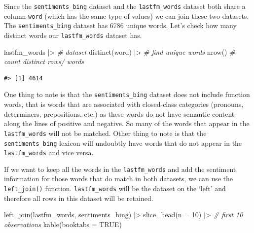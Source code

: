\documentclass[
  letterpaper,
]{latex/krantz}
\newenvironment{Shaded}{\begin{snugshade}}{\end{snugshade}}
\newcommand{\AttributeTok}[1]{\textcolor[rgb]{0.00,0.00,0.00}{#1}}
\newcommand{\CommentTok}[1]{\textcolor[rgb]{0.00,0.00,0.00}{\textit{#1}}}
\newcommand{\ConstantTok}[1]{\textcolor[rgb]{0.00,0.00,0.00}{#1}}
\newcommand{\DecValTok}[1]{\textcolor[rgb]{0.00,0.00,0.00}{#1}}
\newcommand{\FunctionTok}[1]{\textcolor[rgb]{0.00,0.00,0.00}{#1}}
\newcommand{\NormalTok}[1]{\textcolor[rgb]{0.00,0.00,0.00}{#1}}
\newcommand{\SpecialCharTok}[1]{\textcolor[rgb]{0.00,0.00,0.00}{#1}}
\begin{document}
Since the \texttt{sentiments\_bing} dataset and the
\texttt{lastfm\_words} dataset both share a column \texttt{word} (which
has the same type of values) we can join these two datasets. The
\texttt{sentiments\_bing} dataset has 6786 unique words. Let's check how
many distinct words our \texttt{lastfm\_words} dataset has.

\begin{Shaded}
\begin{Highlighting}[]
\NormalTok{lastfm\_words }\SpecialCharTok{|\textgreater{}} \CommentTok{\# dataset}
  \FunctionTok{distinct}\NormalTok{(word) }\SpecialCharTok{|\textgreater{}} \CommentTok{\# find unique words}
  \FunctionTok{nrow}\NormalTok{() }\CommentTok{\# count distinct rows/ words}
\end{Highlighting}
\end{Shaded}

\begin{verbatim}
#> [1] 4614
\end{verbatim}

One thing to note is that the \texttt{sentiments\_bing} dataset does not
include function words, that is words that are associated with
closed-class categories (pronouns, determiners, prepositions, etc.) as
these words do not have semantic content along the lines of positive and
negative. So many of the words that appear in the \texttt{lastfm\_words}
will not be matched. Other thing to note is that the
\texttt{sentiments\_bing} lexicon will undoubtly have words that do not
appear in the \texttt{lastfm\_words} and vice versa.

If we want to keep all the words in the \texttt{lastfm\_words} and add
the sentiment information for those words that do match in both
datasets, we can use the \texttt{left\_join()} function.
\texttt{lastfm\_words} will be the dataset on the `left' and therefore
all rows in this dataset will be retained.

\begin{Shaded}
\begin{Highlighting}[]
\FunctionTok{left\_join}\NormalTok{(lastfm\_words, sentiments\_bing) }\SpecialCharTok{|\textgreater{}} 
  \FunctionTok{slice\_head}\NormalTok{(}\AttributeTok{n =} \DecValTok{10}\NormalTok{) }\SpecialCharTok{|\textgreater{}} \CommentTok{\# first 10 observations}
  \FunctionTok{kable}\NormalTok{(}\AttributeTok{booktabs =} \ConstantTok{TRUE}\NormalTok{)}
\end{Highlighting}
\end{Shaded}
\end{document}
